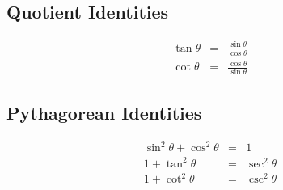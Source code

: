 \documentclass[a4paper,11pt]{book}
\begin{document}
\subsection{Quotient Identities}
\begin{eqnarray*}
\tan\theta &=& \frac{\sin\theta}{\cos\theta} \\
\cot\theta &=& \frac{\cos\theta}{\sin\theta}
\end{eqnarray*}

\subsection{Pythagorean Identities}
\begin{eqnarray*}
\sin^{2}\theta + \cos^{2}\theta &=& 1 \\
1 + \tan^{2}\theta &=& \sec^{2}\theta \\
1 + \cot^{2}\theta &=& \csc^{2}\theta
\end{eqnarray*}
\end{document}
